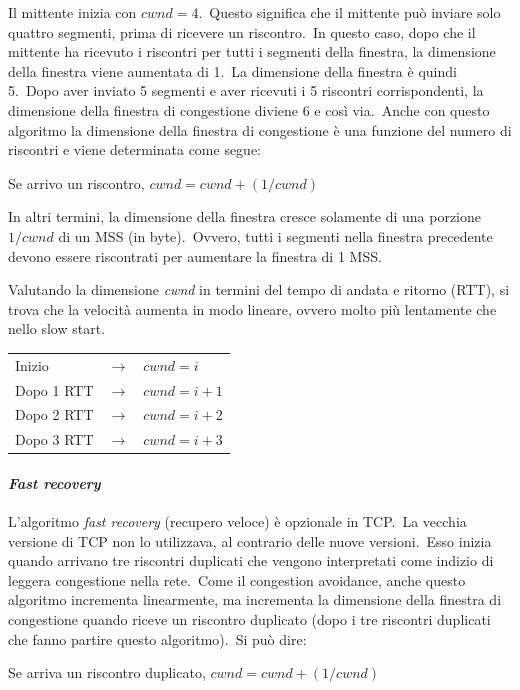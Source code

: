 Il mittente inizia con $cwnd=4$.\
Questo significa che il mittente può inviare solo quattro segmenti, prima di ricevere un riscontro.\
In questo caso, dopo che il mittente ha ricevuto i riscontri per tutti i segmenti della finestra, la dimensione della finestra viene aumentata di 1.\
La dimensione della finestra è quindi 5.\
Dopo aver inviato 5 segmenti e aver ricevuti i 5 riscontri corrispondenti, la dimensione della finestra di congestione diviene 6 e così via.\
Anche con questo algoritmo la dimensione della finestra di congestione è una funzione del numero di riscontri e viene determinata come segue:

\begin{center}
    Se arrivo un riscontro, $cwnd=cwnd+(1/cwnd)$
\end{center}
In altri termini, la dimensione della finestra cresce solamente di una porzione $1/cwnd$ di un MSS (in byte).\
Ovvero, tutti i segmenti nella finestra precedente devono essere riscontrati per aumentare la finestra di 1 MSS.\

Valutando la dimensione \emph{cwnd} in termini del tempo di andata e ritorno (RTT), si trova che la velocità aumenta in modo lineare, ovvero molto più lentamente che nello slow start.

\begin{table}[H]
    \centering
    \begin{tabular}{l c l}
        Inizio     & $\rightarrow$ & $cwnd=i$   \\
        Dopo 1 RTT & $\rightarrow$ & $cwnd=i+1$ \\
        Dopo 2 RTT & $\rightarrow$ & $cwnd=i+2$ \\
        Dopo 3 RTT & $\rightarrow$ & $cwnd=i+3$ \\
    \end{tabular}
\end{table}

\paragraph{\emph{Fast recovery}}

L'algoritmo \emph{fast recovery} (recupero veloce) è opzionale in TCP.\
La vecchia versione di TCP non lo utilizzava, al contrario delle nuove versioni.\
Esso inizia quando arrivano tre riscontri duplicati che vengono interpretati come indizio di leggera congestione nella rete.\
Come il congestion avoidance, anche questo algoritmo incrementa linearmente, ma incrementa la dimensione della finestra di congestione quando riceve un riscontro duplicato (dopo i tre riscontri duplicati che fanno partire questo algoritmo).\
Si può dire:
\begin{center}
    Se arriva un riscontro duplicato, $cwnd=cwnd+(1/cwnd)$
\end{center}

